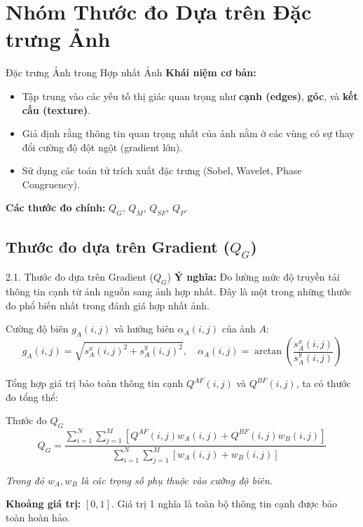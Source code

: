 \documentclass{beamer}
\begin{document}
\section{Nhóm Thước đo Dựa trên Đặc trưng Ảnh}

\begin{frame}{Đặc trưng Ảnh trong Hợp nhất Ảnh}
    \textbf{Khái niệm cơ bản:}
    \begin{itemize}
        \item Tập trung vào các yếu tố thị giác quan trọng như \textbf{cạnh (edges)}, \textbf{góc}, và \textbf{kết cấu (texture)}.
        \item Giả định rằng thông tin quan trọng nhất của ảnh nằm ở các vùng có sự thay đổi cường độ đột ngột (gradient lớn).
        \item Sử dụng các toán tử trích xuất đặc trưng (Sobel, Wavelet, Phase Congruency).
    \end{itemize}
    
    \vspace{0.4cm}
    \textbf{Các thước đo chính:} $Q_G$, $Q_M$, $Q_{SF}$, $Q_P$.
\end{frame}

\subsection{Thước đo dựa trên Gradient ($Q_G$)}

\begin{frame}{2.1. Thước đo dựa trên Gradient ($Q_G$)}
    \textbf{Ý nghĩa:} Đo lường mức độ truyền tải thông tin cạnh từ ảnh nguồn sang ảnh hợp nhất. Đây là một trong những thước đo phổ biến nhất trong đánh giá hợp nhất ảnh.

    \vspace{0.2cm}
    Cường độ biên $g_A(i,j)$ và hướng biên $\alpha_A(i,j)$ của ảnh $A$:
    \begin{equation}
        g_A(i,j) = \sqrt{s^x_A(i,j)^2 + s^y_A(i,j)^2}, \quad \alpha_A(i,j) = \arctan \left( \frac{s^x_A(i,j)}{s^y_A(i,j)} \right)
    \end{equation}

    \vspace{0.2cm}
    Tổng hợp giá trị bảo toàn thông tin cạnh $Q^{AF}(i,j)$ và $Q^{BF}(i,j)$, ta có thước đo tổng thể:
    \begin{block}{Thước đo $Q_G$}
    \begin{equation}
        Q_G = \frac{\sum_{i=1}^N \sum_{j=1}^M \left[ Q^{AF}(i,j)w_A(i,j) + Q^{BF}(i,j)w_B(i,j) \right]}{\sum_{i=1}^N \sum_{j=1}^M \left[ w_A(i,j) + w_B(i,j) \right]}
    \end{equation}
    \end{block}
    \footnotesize{\textit{Trong đó $w_A, w_B$ là các trọng số phụ thuộc vào cường độ biên.}}

    \vspace{0.3cm}
    \textbf{Khoảng giá trị:} $[0, 1]$. Giá trị 1 nghĩa là toàn bộ thông tin cạnh được bảo toàn hoàn hảo.
\end{frame}
\end{document}
